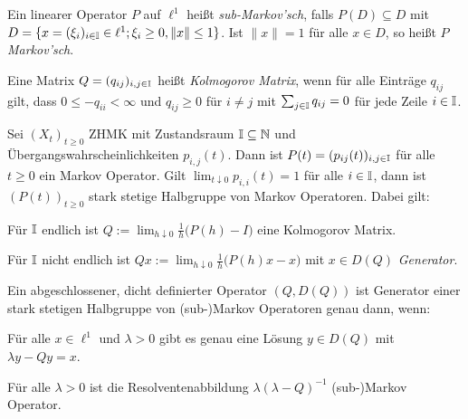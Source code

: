 \documentclass[a4paper]{paper}
\begin{document}
\begin{defi}
\begin{compactenum}
\item  Ein linearer Operator $P$ auf $\ell^1$ heißt   \textit{sub-Markov'sch}, falls $P(D)\subseteq D$ mit $D=\{x=(\xi_i)_{i\in\mathbb{I}}\in \ell^1; \xi_i\geq0, \|x\|\leq1\}$. Ist $\|x\|=1$ für alle $x\in D$, so heißt $P$ \textit{Markov'sch}.
\item Eine Matrix $Q=(q_{ij})_{i,j\in\mathbb{I}}$ heißt \textit{Kolmogorov Matrix}, wenn für alle Einträge $q_{ij}$ gilt, dass  $0\leq -q_{ii}< \infty$ und $q_{ij}\geq0$ für $i\neq j$ mit  $\sum_{j\in\mathbb{I}}q_{ij}=0$ für jede Zeile $i\in\mathbb{I}$.
\end{compactenum}
\end{defi}

\begin{prop} Sei  $(X_t)_{t\geq0}$  ZHMK mit Zustandsraum $\mathbb{I}\subseteq \mathbb{N}$ und Übergangswahrscheinlichkeiten $p_{i,j}(t)$. Dann ist $P(t)=(p_{ij}(t))_{i,j\in\mathbb{I}}$ für alle $t\geq0$  ein Markov Operator. Gilt $\lim_{t\downarrow 0}p_{i,i}(t)=1$ für alle  $i\in\mathbb{I}$, dann ist $(P(t))_{t\geq0}$  stark stetige Halbgruppe von Markov Operatoren. Dabei gilt:
\begin{compactenum}
   \item Für $\mathbb{I}$ endlich ist  $Q:=\lim_{h\downarrow 0}\frac{1}{h}\big(P(h)-I\big)$ eine Kolmogorov Matrix.
   \item Für $\mathbb{I}$ nicht endlich ist  $Qx:=\lim_{h\downarrow0}\frac{1}{h}\big(P(h)x-x\big)$ mit $x\in D(Q)$  \textit{Generator}.
   \end{compactenum}
\end{prop}

\begin{fsatz} Ein abgeschlossener, dicht definierter Operator $(Q, D(Q))$ ist Generator einer stark stetigen Halbgruppe von (sub-)Markov Operatoren genau dann, wenn:
  \begin{compactenum}
      \item Für alle $x\in \ell^1$ und $\lambda>0$ gibt es genau eine Lösung $y\in D(Q)$ mit $\lambda y- Qy = x$. 
      \item Für alle $\lambda>0$ ist die Resolventenabbildung  $\lambda (\lambda-Q)^{-1}$ (sub-)Markov Operator. 
  \end{compactenum}
  \end{fsatz}
  
\end{document}
